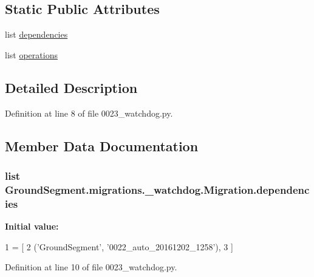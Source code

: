 \subsection*{Static Public Attributes}
\begin{DoxyCompactItemize}
\item 
list \hyperlink{class_ground_segment_1_1migrations_1_10023__watchdog_1_1_migration_aead5603959161c899852891cd6e63cc1}{dependencies}
\item 
list \hyperlink{class_ground_segment_1_1migrations_1_10023__watchdog_1_1_migration_aedbaf5f24fd223907b71a2784f5302e3}{operations}
\end{DoxyCompactItemize}


\subsection{Detailed Description}


Definition at line 8 of file 0023\+\_\+watchdog.\+py.



\subsection{Member Data Documentation}
\hypertarget{class_ground_segment_1_1migrations_1_10023__watchdog_1_1_migration_aead5603959161c899852891cd6e63cc1}{}
\subsubsection[{dependencies}]{\setlength{\rightskip}{0pt plus 5cm}list Ground\+Segment.\+migrations.\+\_\+watchdog.\+Migration.\+dependencies\hspace{0.3cm}{\ttfamily [static]}}\label{class_ground_segment_1_1migrations_1_10023__watchdog_1_1_migration_aead5603959161c899852891cd6e63cc1}
{\bfseries Initial value\+:}
\begin{DoxyCode}
1 = [
2         (\textcolor{stringliteral}{'GroundSegment'}, \textcolor{stringliteral}{'0022\_auto\_20161202\_1258'}),
3     ]
\end{DoxyCode}


Definition at line 10 of file 0023\+\_\+watchdog.\+py.

